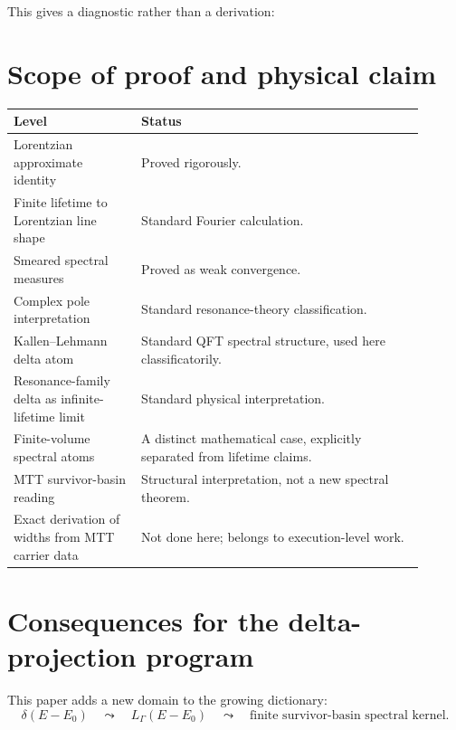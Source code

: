 \documentclass[11pt]{article}
\begin{document}
This gives a diagnostic rather than a derivation:
\begin{center}
\end{center}

\section{Scope of proof and physical claim}

\begin{center}
\begin{tabular}{>{\raggedright\arraybackslash}p{0.28\linewidth}>{\raggedright\arraybackslash}p{0.62\linewidth}}
\hline
Level & Status\\
\hline
Lorentzian approximate identity & Proved rigorously.\\
Finite lifetime to Lorentzian line shape & Standard Fourier calculation.\\
Smeared spectral measures & Proved as weak convergence.\\
Complex pole interpretation & Standard resonance-theory classification.\\
Kallen--Lehmann delta atom & Standard QFT spectral structure, used here classificatorily.\\
Resonance-family delta as infinite-lifetime limit & Standard physical interpretation.\\
Finite-volume spectral atoms & A distinct mathematical case, explicitly separated from lifetime claims.\\
MTT survivor-basin reading & Structural interpretation, not a new spectral theorem.\\
Exact derivation of widths from MTT carrier data & Not done here; belongs to execution-level work.\\
\hline
\end{tabular}
\end{center}

\section{Consequences for the delta-projection program}

This paper adds a new domain to the growing dictionary:
\[
\delta(E-E_0)
\quad\leadsto\quad
L_\Gamma(E-E_0)
\quad\leadsto\quad
\text{finite survivor-basin spectral kernel}.
\]
\end{document}
